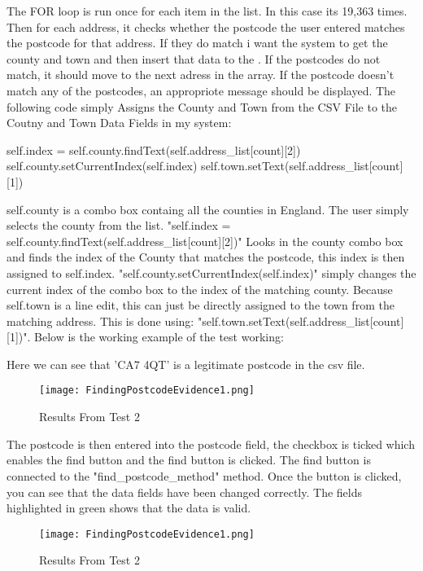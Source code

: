 The FOR loop is run once for each item in the list. In this case its 19,363 times. Then for each address, it checks whether the postcode the user entered matches the postcode for that address. If they do match i want the system to get the county and town and then insert that data to the . If the postcodes do not match, it should move to the next adress in the array. If the postcode doesn't match any of the postcodes, an appropriote message should be displayed. The following code simply Assigns the County and Town from the CSV File to the Coutny and Town Data Fields in my system:
\begin{python}
self.index = self.county.findText(self.address_list[count][2])
                                        self.county.setCurrentIndex(self.index)
                                        self.town.setText(self.address_list[count][1])
\end{python}

 self.county is a combo box containg all the counties in England. The user simply selects the county from the list. "self.index = self.county.findText(self.address_list[count][2])" Looks in the county combo box and finds the index of the County that matches the postcode, this index is then assigned to self.index.  "self.county.setCurrentIndex(self.index)" simply changes the current index of the combo box to the index of the matching county. Because self.town is a line edit, this can just be directly assigned to the town from the matching address. This is done using: "self.town.setText(self.address_list[count][1])". Below is the working example of the test working:

Here we can see that 'CA7 4QT' is a legitimate postcode in the csv file.
\begin{figure}[H]
\caption{Results From Test 2} \label{fig:Results From Test 2}
\hfill\texttt{[image: FindingPostcodeEvidence1.png]}\hspace*{\fill}
\end{figure}

The postcode is then entered into the postcode field, the checkbox is ticked which enables the find button and the find button is clicked. The find button is connected to the "find_postcode_method" method. Once the button is clicked, you can see that the data fields have been changed correctly. The fields highlighted in green shows that the data is valid.

\begin{figure}[H]
\caption{Results From Test 2} \label{fig:Results From Test 2}
\hfill\texttt{[image: FindingPostcodeEvidence1.png]}\hspace*{\fill}
\end{figure}


